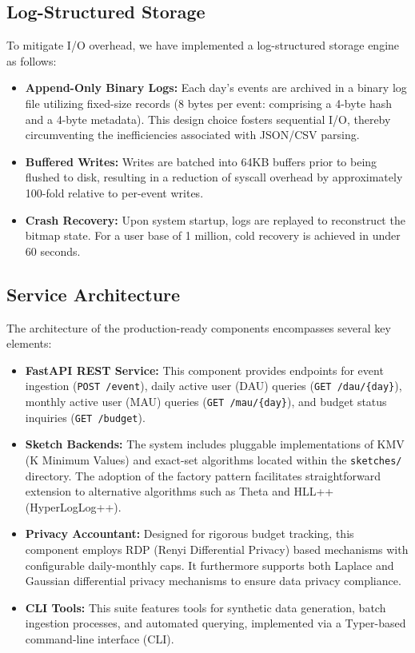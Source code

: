 \documentclass[sigconf,anonymous,review]{acmart}
\begin{document}
\subsection{Log-Structured Storage}

To mitigate I/O overhead, we have implemented a log-structured storage engine as follows:

\begin{itemize}
    \item \textbf{Append-Only Binary Logs:} Each day's events are archived in a binary log file utilizing fixed-size records (8 bytes per event: comprising a 4-byte hash and a 4-byte metadata). This design choice fosters sequential I/O, thereby circumventing the inefficiencies associated with JSON/CSV parsing.

    \item \textbf{Buffered Writes:} Writes are batched into 64KB buffers prior to being flushed to disk, resulting in a reduction of syscall overhead by approximately 100-fold relative to per-event writes.

    \item \textbf{Crash Recovery:} Upon system startup, logs are replayed to reconstruct the bitmap state. For a user base of 1 million, cold recovery is achieved in under 60 seconds.
\end{itemize}

\subsection{Service Architecture}

The architecture of the production-ready components encompasses several key elements:

\begin{itemize}
    \item \textbf{FastAPI REST Service:} This component provides endpoints for event ingestion (\texttt{POST /event}), daily active user (DAU) queries (\texttt{GET /dau/\{day\}}), monthly active user (MAU) queries (\texttt{GET /mau/\{day\}}), and budget status inquiries (\texttt{GET /budget}).

    \item \textbf{Sketch Backends:} The system includes pluggable implementations of KMV (K Minimum Values) and exact-set algorithms located within the \texttt{sketches/} directory. The adoption of the factory pattern facilitates straightforward extension to alternative algorithms such as Theta and HLL++ (HyperLogLog++).

    \item \textbf{Privacy Accountant:} Designed for rigorous budget tracking, this component employs RDP (Renyi Differential Privacy) based mechanisms with configurable daily-monthly caps. It furthermore supports both Laplace and Gaussian differential privacy mechanisms to ensure data privacy compliance.

    \item \textbf{CLI Tools:} This suite features tools for synthetic data generation, batch ingestion processes, and automated querying, implemented via a Typer-based command-line interface (CLI).
\end{itemize}
\end{document}
